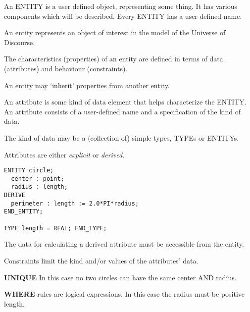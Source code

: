 \begin{remarks}
\remintro
{}

An ENTITY is a user defined object, representing some thing. It has
various components which will be described. Every ENTITY has a user-defined
name.

\remend
\end{remarks}


    An entity represents an object of interest in the model of the Universe
of Discourse.

    The characteristics (properties) of an entity are defined in terms of data
(attributes) and behaviour (constraints).

    An entity may `inherit' properties from another entity.


\begin{remarks}
\remintro
{}

An attribute is some kind of data element that helps characterize the ENTITY.
An attribute consists of a user-defined name and a specification of the
kind of data. 

The kind of data may be a (collection of) simple types, TYPEs or ENTITYs.

\remend
\end{remarks}


    Attributes are either \emph{explicit} or \emph{derived}.
\begin{verbatim}
ENTITY circle;
  center : point;
  radius : length;
DERIVE
  perimeter : length := 2.0*PI*radius;
END_ENTITY;

TYPE length = REAL; END_TYPE;
\end{verbatim}
The data for calculating a derived attribute must be accessible from 
the entity.


\begin{remarks}
\remintro
{}

Constraints limit the kind and/or values of the attributes' data.

\textbf{UNIQUE} 
In this case no two circles can have the same center AND radius.

\textbf{WHERE} rules are logical expressions. In this case
the radius must be positive length.

\remend
\end{remarks}


